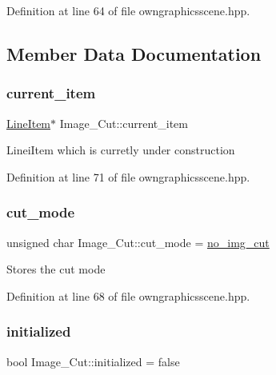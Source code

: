 Definition at line 64 of file owngraphicsscene.\+hpp.



\subsection{Member Data Documentation}
\mbox{\label{structImage__Cut_aa3fcac1ab311c38947b343d8913fb2e8}} 
\subsubsection{\texorpdfstring{current\+\_\+item}{current\_item}}
{\footnotesize\ttfamily \mbox{\hyperlink{classLineItem}{Line\+Item}}$\ast$ Image\+\_\+\+Cut\+::current\+\_\+item}

Linei\+Item which is curretly under construction 

Definition at line 71 of file owngraphicsscene.\+hpp.

\mbox{\label{structImage__Cut_ad4904a8753086961301a91050f6b2794}} 
\subsubsection{\texorpdfstring{cut\+\_\+mode}{cut\_mode}}
{\footnotesize\ttfamily unsigned char Image\+\_\+\+Cut\+::cut\+\_\+mode = \mbox{\hyperlink{owngraphicsscene_8hpp_a749db80b860523fda0b90a1c2afa5067}{no\+\_\+img\+\_\+cut}}}

Stores the cut mode 

Definition at line 68 of file owngraphicsscene.\+hpp.

\mbox{\label{structImage__Cut_a7259136300a6eade3ee84743f3e47c1f}} 
\subsubsection{\texorpdfstring{initialized}{initialized}}
{\footnotesize\ttfamily bool Image\+\_\+\+Cut\+::initialized = false}

